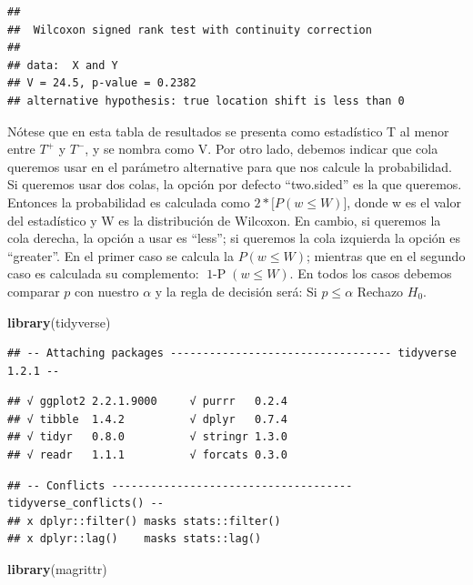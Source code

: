 \documentclass[]{book}
\newenvironment{Shaded}{\begin{snugshade}}{\end{snugshade}}
\newcommand{\KeywordTok}[1]{\textcolor[rgb]{0.13,0.29,0.53}{\textbf{#1}}}
\newcommand{\NormalTok}[1]{#1}
\theoremstyle{definition}
\theoremstyle{definition}
\theoremstyle{definition}
\theoremstyle{remark}
\begin{document}
\begin{verbatim}
## 
##  Wilcoxon signed rank test with continuity correction
## 
## data:  X and Y
## V = 24.5, p-value = 0.2382
## alternative hypothesis: true location shift is less than 0
\end{verbatim}

Nótese que en esta tabla de resultados se presenta como estadístico T al
menor entre \(T^{+}\) y \(T^{-}\), y se nombra como V. Por otro lado,
debemos indicar que cola queremos usar en el parámetro alternative para
que nos calcule la probabilidad. Si queremos usar dos colas, la opción
por defecto ``two.sided'' es la que queremos. Entonces la probabilidad
es calculada como \(2*\lbrack P(w \leq W)\rbrack\), donde w es el valor
del estadístico y W es la distribución de Wilcoxon. En cambio, si
queremos la cola derecha, la opción a usar es ``less''; si queremos la
cola izquierda la opción es ``greater''. En el primer caso se calcula la
\(P(w \leq W)\); mientras que en el segundo caso es calculada su
complemento: \(\operatorname{1-P}\left( w \leq W \right)\). En todos los
casos debemos comparar \(p\) con nuestro \(\alpha\) y la regla de
decisión será: Si \(p \leq \alpha\) Rechazo \(H_{0}\).

\begin{Shaded}
\begin{Highlighting}[]
\KeywordTok{library}\NormalTok{(tidyverse)}
\end{Highlighting}
\end{Shaded}

\begin{verbatim}
## -- Attaching packages ---------------------------------- tidyverse 1.2.1 --
\end{verbatim}

\begin{verbatim}
## √ ggplot2 2.2.1.9000     √ purrr   0.2.4     
## √ tibble  1.4.2          √ dplyr   0.7.4     
## √ tidyr   0.8.0          √ stringr 1.3.0     
## √ readr   1.1.1          √ forcats 0.3.0
\end{verbatim}

\begin{verbatim}
## -- Conflicts ------------------------------------- tidyverse_conflicts() --
## x dplyr::filter() masks stats::filter()
## x dplyr::lag()    masks stats::lag()
\end{verbatim}

\begin{Shaded}
\begin{Highlighting}[]
\KeywordTok{library}\NormalTok{(magrittr)}
\end{Highlighting}
\end{Shaded}
\end{document}
